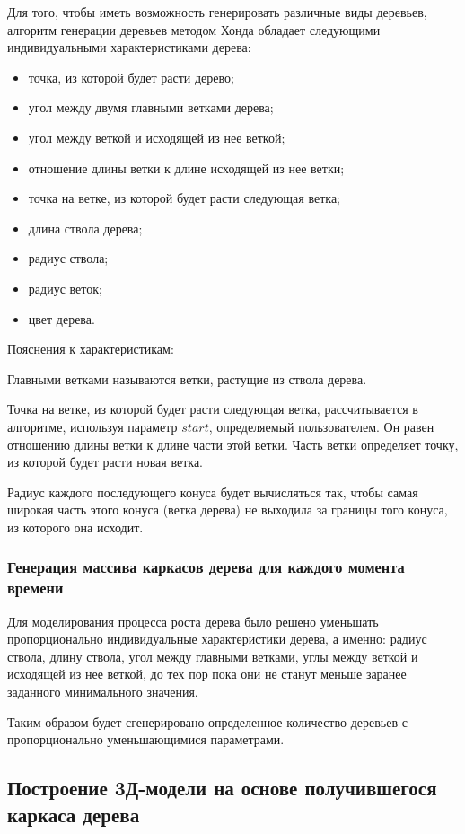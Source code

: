 \documentclass[54pt, a4paper]{article}
\begin{document}
	Для того, чтобы иметь возможность генерировать различные виды деревьев, алгоритм генерации деревьев методом Хонда обладает следующими индивидуальными характеристиками дерева:
	\begin{itemize}
		\item точка, из которой будет расти дерево;
		\item угол между двумя главными ветками дерева;
		\item угол между веткой и исходящей из нее веткой;
		\item отношение длины ветки к длине исходящей из нее ветки;
		\item точка на ветке, из которой будет расти следующая ветка;
		\item длина ствола дерева;
		\item радиус ствола;
		\item радиус веток;
		\item цвет дерева.
	\end{itemize}

	Пояснения к характеристикам:
	
	Главными ветками называются ветки, растущие из ствола дерева.
	
	Точка на ветке, из которой будет расти следующая ветка, рассчитывается в алгоритме, используя параметр $start$, определяемый пользователем. Он равен отношению длины ветки к длине части этой ветки. Часть ветки определяет точку, из которой будет расти новая ветка.
	
	Радиус каждого последующего конуса будет вычисляться так, чтобы самая широкая часть этого конуса (ветка дерева) не выходила за границы того конуса, из которого она исходит.
	
	
	\subsubsection{Генерация массива каркасов дерева для каждого момента времени}
	
	Для моделирования процесса роста дерева было решено уменьшать пропорционально индивидуальные характеристики дерева, а именно: радиус ствола, длину ствола, угол между главными ветками, углы между веткой и исходящей из нее веткой, до тех пор пока они не станут меньше заранее заданного минимального значения. 
	
	Таким образом будет сгенерировано определенное количество деревьев с пропорционально уменьшающимися параметрами.
	
	
	\subsection{Построение 3Д-модели на основе получившегося каркаса дерева}
	
\end{document}
